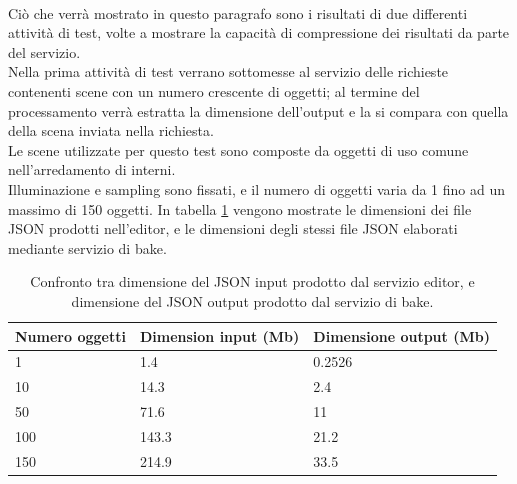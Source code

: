 \\
Ciò che verrà mostrato in questo paragrafo sono i risultati di due differenti attività di test, volte a mostrare la capacità di compressione dei risultati da parte del servizio. 
\\
Nella prima attività di test verrano sottomesse al servizio delle richieste contenenti scene con un numero crescente di oggetti; al termine del processamento verrà estratta la dimensione dell’output e la si compara con quella della scena inviata nella richiesta. 
\\
Le scene utilizzate per questo test sono composte da oggetti di uso comune nell’arredamento di interni. 
\\
Illuminazione e sampling sono fissati, e il numero di oggetti varia da 1 fino ad un massimo di 150 oggetti. In tabella \ref{table:dim_obj} vengono mostrate le dimensioni dei file JSON prodotti nell'editor, e le dimensioni degli stessi file JSON elaborati mediante servizio di bake.

\begin{table}[]
\centering
\caption[Confronto dimensioni input-output]{Confronto tra dimensione del JSON input prodotto dal servizio editor, e dimensione del JSON output prodotto dal servizio di bake.}
\begin{tabular}{|l|l|l|}
\hline
\textbf{Numero oggetti} & \textbf{Dimension input (Mb)} & \textbf{Dimensione output (Mb)} \\ \hline
1 & 1.4 & 0.2526 \\ \hline
10 & 14.3 & 2.4 \\ \hline
50 & 71.6 & 11 \\ \hline
100 & 143.3 & 21.2 \\ \hline
150 & 214.9 & 33.5 \\ \hline
\end{tabular}
\label{table:dim_obj}
\end{table}

